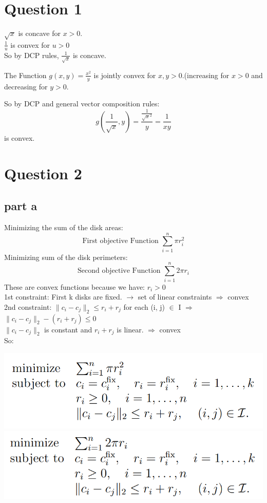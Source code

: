 \documentclass{uofa-eng-assignment}
\begin{document}
\maketitle

\section*{Question 1}

$\sqrt{x}$ is concave for $x > 0$.\\
$\frac{1}{u}$ is convex for $u > 0$\\
So by DCP rules, $\frac{1}{\sqrt{x}}$ is concave.

The Function $g(x, y) = \frac{x^2}{y}$ is jointly convex for $x,y > 0$.(increasing for $x>0$ and decreasing for $ y > 0$.

So by DCP and general vector composition rules:
\[
g(\frac{1}{\sqrt{x}}, y) = \frac{\frac{1}{\sqrt{x}^2}}{y} = \frac{1}{xy}
\]
is convex.

\section*{Question 2}

\subsection*{part a}

Minimizing the sum of the disk areas:
\[
\text{First objective Function } \sum_{i=1}^{n} \pi r_i^2
\]
Minimizing
sum of the disk
perimeters:
\[
\text{Second objective Function } \sum_{i=1}^{n} 2\pi r_i
\]
These are convex functions because we have: $r_i > 0$ \\
1st constraint: First k disks are fixed. $\rightarrow$ set of linear constraints $\Rightarrow$ convex\\
2nd constraint: $\lVert c_i -c_j \rVert_2 \le r_i+r_j$ for each (i, j) $\in$ I $\Rightarrow$ $\lVert c_i -c_j \rVert_2 - (r_i+r_j) \le 0$\\
$\lVert c_i -c_j \rVert_2$ is constant and $r_i+r_j$ is linear. $\Rightarrow$ convex\\
So:


\includegraphics[width=0.5\linewidth]{screenshot003}
\includegraphics[width=0.5\linewidth]{screenshot004}
\end{document}
